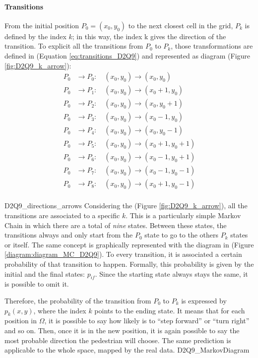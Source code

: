 \documentclass[class=article, crop=false]{standalone}
\begin{document}
\paragraph{Transitions} 
From the initial position $P_0=(x_0, y_0)$ to the next closest cell in the grid, $P_k$ is defined by the index $k$; in this way, the index k gives the direction of the transition. 
To explicit all the transitions from $P_0$ to $P_k$, those transformations are defined in (Equation \ref{eq:transitions_D2Q9}) and represented as diagram (Figure \ref{fig:D2Q9_k_arrow}):
\begin{equation}
\begin{split}
P_0 &\to P_0 : \quad (x_0, y_0) \to (x_0, y_0) \\
P_0 &\to P_1 : \quad (x_0, y_0) \to (x_0+1, y_0) \\
P_0 &\to P_2 : \quad (x_0, y_0) \to (x_0, y_0+1) \\
P_0 &\to P_3 : \quad (x_0, y_0) \to (x_0-1, y_0) \\
P_0 &\to P_4 : \quad (x_0, y_0) \to (x_0, y_0-1) \\
P_0 &\to P_5 : \quad (x_0, y_0) \to (x_0+1, y_0+1) \\
P_0 &\to P_6 : \quad (x_0, y_0) \to (x_0-1, y_0+1) \\
P_0 &\to P_7 : \quad (x_0, y_0) \to (x_0-1, y_0-1) \\
P_0 &\to P_8 : \quad (x_0, y_0) \to (x_0+1, y_0-1) \\
\end{split}
\label{eq:transitions_D2Q9}
\end{equation}

	{D2Q9_directions_arrows}
Considering the (Figure \ref{fig:D2Q9_k_arrow}), all the transitions are associated to a specific $k$. 
This is a particularly simple Markov Chain in which there are a total of \emph{nine} states. 
Between these states, the transitions always and only start from the $P_0$ state to go to the others $P_k$ states or itself. 
The same concept is graphically represented with the diagram in (Figure \ref{diagram:diagram_MC_D2Q9}). 
To every transition, it is associated a certain probability of that transition to happen. 
Formally, this probability is given by the initial and the final states: $p_{if}$. 
Since the starting state always stays the same, it is possible to omit it. 

Therefore, the probability of the transition from $P_0$ to $P_k$ is expressed by $p_k(x, y)$, where the index $k$ points to the ending state. 
It means that for each position in $\Omega$, it is possible to say how likely is to “step forward” or “turn right” and so on. 
Then, once it is in the new position, it is again possible to say the most probable direction the pedestrian will choose. 
The same prediction is applicable to the whole space, mapped by the real data.
	{D2Q9_MarkovDiagram}
\end{document}
